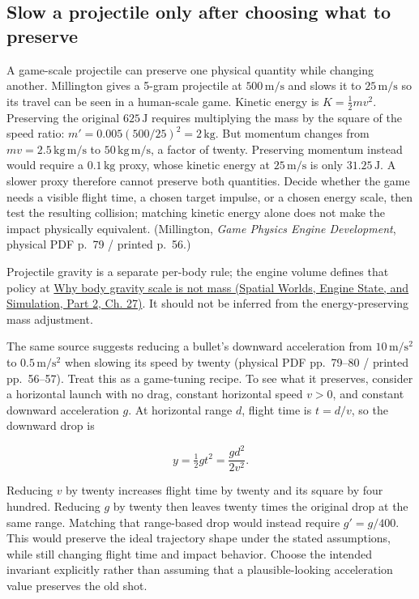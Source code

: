 \subsection{Slow a projectile only after choosing what to preserve}\label{06-engine-ii-ch047-slow-a-projectile-only-after-choosing-what-to-preserve}

\hypertarget{06-engine-ii-ch047-slow-a-projectile-only-after-choosing-what-to-preserve}{}

A game-scale projectile can preserve one physical quantity while changing another. Millington gives a 5-gram projectile at \(500\,\mathrm{m/s}\) and slows it to \(25\,\mathrm{m/s}\) so its travel can be seen in a human-scale game. Kinetic energy is \(K=\tfrac12mv^2\). Preserving the original \(625\,\mathrm J\) requires multiplying the mass by the square of the speed ratio: \(m'=0.005(500/25)^2=2\,\mathrm{kg}\). But momentum changes from \(mv=2.5\,\mathrm{kg\,m/s}\) to \(50\,\mathrm{kg\,m/s}\), a factor of twenty. Preserving momentum instead would require a \(0.1\,\mathrm{kg}\) proxy, whose kinetic energy at \(25\,\mathrm{m/s}\) is only \(31.25\,\mathrm J\). A slower proxy therefore cannot preserve both quantities. Decide whether the game needs a visible flight time, a chosen target impulse, or a chosen energy scale, then test the resulting collision; matching kinetic energy alone does not make the impact physically equivalent. (Millington, \emph{Game Physics Engine Development}, physical PDF p.~79 / printed p.~56.)

Projectile gravity is a separate per-body rule; the engine volume defines that policy at \href{../05-Spatial-Worlds-Engine-State-and-Simulation-P02/main.pdf\#nameddest=06-engine-ii-ch038-why-body-gravity-scale-is-not-mass}{Why body gravity scale is not mass (Spatial Worlds, Engine State, and Simulation, Part 2, Ch. 27)}. It should not be inferred from the energy-preserving mass adjustment.

The same source suggests reducing a bullet's downward acceleration from \(10\,\mathrm{m/s^2}\) to \(0.5\,\mathrm{m/s^2}\) when slowing its speed by twenty (physical PDF pp.~79--80 / printed pp.~56--57). Treat this as a game-tuning recipe. To see what it preserves, consider a horizontal launch with no drag, constant horizontal speed \(v>0\), and constant downward acceleration \(g\). At horizontal range \(d\), flight time is \(t=d/v\), so the downward drop is

\[
y=\tfrac12g t^2=\frac{g d^2}{2v^2}.
\]

Reducing \(v\) by twenty increases flight time by twenty and its square by four hundred. Reducing \(g\) by twenty then leaves twenty times the original drop at the same range. Matching that range-based drop would instead require \(g'=g/400\). This would preserve the ideal trajectory shape under the stated assumptions, while still changing flight time and impact behavior. Choose the intended invariant explicitly rather than assuming that a plausible-looking acceleration value preserves the old shot.

